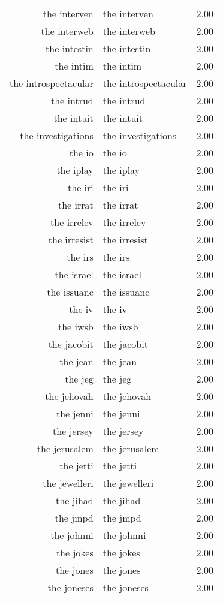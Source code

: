 \begin{table}[ht]
\begin{tabular}{rlr}
  the interven & the interven & 2.00 \\ 
  the interweb & the interweb & 2.00 \\ 
  the intestin & the intestin & 2.00 \\ 
  the intim & the intim & 2.00 \\ 
  the introspectacular & the introspectacular & 2.00 \\ 
  the intrud & the intrud & 2.00 \\ 
  the intuit & the intuit & 2.00 \\ 
  the investigations & the investigations & 2.00 \\ 
  the io & the io & 2.00 \\ 
  the iplay & the iplay & 2.00 \\ 
  the iri & the iri & 2.00 \\ 
  the irrat & the irrat & 2.00 \\ 
  the irrelev & the irrelev & 2.00 \\ 
  the irresist & the irresist & 2.00 \\ 
  the irs & the irs & 2.00 \\ 
  the israel & the israel & 2.00 \\ 
  the issuanc & the issuanc & 2.00 \\ 
  the iv & the iv & 2.00 \\ 
  the iwsb & the iwsb & 2.00 \\ 
  the jacobit & the jacobit & 2.00 \\ 
  the jean & the jean & 2.00 \\ 
  the jeg & the jeg & 2.00 \\ 
  the jehovah & the jehovah & 2.00 \\ 
  the jenni & the jenni & 2.00 \\ 
  the jersey & the jersey & 2.00 \\ 
  the jerusalem & the jerusalem & 2.00 \\ 
  the jetti & the jetti & 2.00 \\ 
  the jewelleri & the jewelleri & 2.00 \\ 
  the jihad & the jihad & 2.00 \\ 
  the jmpd & the jmpd & 2.00 \\ 
  the johnni & the johnni & 2.00 \\ 
  the jokes & the jokes & 2.00 \\ 
  the jones & the jones & 2.00 \\ 
  the joneses & the joneses & 2.00 \\ 

\end{tabular}
\end{table}

